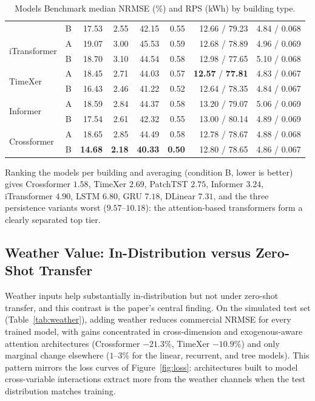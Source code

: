 \documentclass[11pt]{article}
\begin{document}
\begin{table}[H]
\begin{tabular}{ll rr rr rr}
     & B & 17.53 & 2.55 & 42.15 & 0.55 & 12.66 / 79.23 & 4.84 / 0.068 \\
\multirow{2}{*}{iTransformer}
     & A & 19.07 & 3.00 & 45.53 & 0.59 & 12.68 / 78.89 & 4.96 / 0.069 \\
     & B & 18.70 & 3.10 & 44.54 & 0.58 & 12.98 / 77.65 & 5.10 / 0.068 \\
\multirow{2}{*}{TimeXer}
     & A & 18.45 & 2.71 & 44.03 & 0.57 & \textbf{12.57} / \textbf{77.81} & 4.83 / 0.067 \\
     & B & 16.43 & 2.46 & 41.22 & 0.52 & 12.64 / 78.35 & 4.84 / 0.067 \\
\multirow{2}{*}{Informer}
     & A & 18.59 & 2.84 & 44.37 & 0.58 & 13.20 / 79.07 & 5.06 / 0.069 \\
     & B & 17.54 & 2.61 & 42.32 & 0.55 & 13.00 / 80.14 & 4.89 / 0.069 \\
\multirow{2}{*}{Crossformer}
     & A & 18.65 & 2.85 & 44.49 & 0.58 & 12.78 / 78.67 & 4.88 / 0.068 \\
     & B & \textbf{14.68} & \textbf{2.18} & \textbf{40.33} & \textbf{0.50} & 12.80 / 78.65 & 4.86 / 0.067 \\
\bottomrule
\end{tabular}
\caption{Models Benchmark median NRMSE (\%) and RPS (kWh) by building type. }
\label{tab:benchmark}
\end{table}

Ranking the models per building and averaging (condition B, lower is better)
gives Crossformer $1.58$, TimeXer $2.69$, PatchTST $2.75$, Informer $3.24$,
iTransformer $4.90$, LSTM $6.80$, GRU $7.18$, DLinear $7.31$, and the three
persistence variants worst ($9.57$--$10.18$): the attention-based transformers
form a clearly separated top tier.

\subsection{Weather Value: In-Distribution versus Zero-Shot Transfer}
\label{sec:weather}
Weather inputs help substantially in-distribution but not under zero-shot transfer,
and this contrast is the paper's central finding. On the simulated test set
(Table~\ref{tab:weather}), adding weather reduces commercial NRMSE for every trained
model, with gains concentrated in cross-dimension and exogenous-aware attention
architectures (Crossformer $-21.3\%$, TimeXer $-10.9\%$) and only marginal change
elsewhere ($1$--$3\%$ for the linear, recurrent, and tree models). This pattern
mirrors the loss curves of Figure~\ref{fig:loss}: architectures built to model
cross-variable interactions extract more from the weather channels when the test
distribution matches training.
\end{document}
